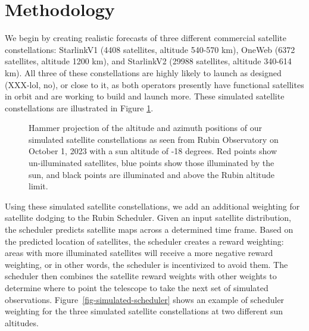 \documentclass[linenumbers]{aastex631}
\begin{document}

\section{Methodology}
We begin by creating realistic forecasts of three different commercial satellite constellations: StarlinkV1 (4408 satellites, altitude 540-570 km), OneWeb (6372 satellites, altitude 1200 km), and StarlinkV2 (29988 satellites, altitude 340-614 km). All three of these constellations are highly likely to launch as designed (XXX-lol, no), or close to it, as both operators presently have functional satellites in orbit and are working to build and launch more. These simulated satellite
constellations are illustrated in Figure \ref{fig-simulated-constellations}.

\begin{figure}[ht!]
\caption{Hammer projection of the altitude and azimuth positions of our simulated satellite constellations as seen from Rubin Observatory on October 1, 2023 with a sun altitude of -18 degrees. Red points show un-illuminated satellites, blue points show those illuminated by the sun, and black points are illuminated and above the Rubin altitude limit. \label{fig-simulated-constellations}}
\end{figure}

Using these simulated satellite constellations, we add an additional weighting for satellite
dodging to the Rubin Scheduler. Given an input satellite distribution, the scheduler predicts
satellite maps across a determined time frame. Based on the predicted location of satellites, the
scheduler creates a reward weighting: areas with more illuminated satellites will receive a more
negative reward weighting, or in other words, the scheduler is incentivized to avoid them. The
scheduler then combines the satellite reward weights with other weights to determine where to
point the telescope to take the next set of simulated observations. Figure~\ref{fig-simulated-scheduler} shows an example of
scheduler weighting for the three simulated satellite constellations at two different sun altitudes.
\end{document}

